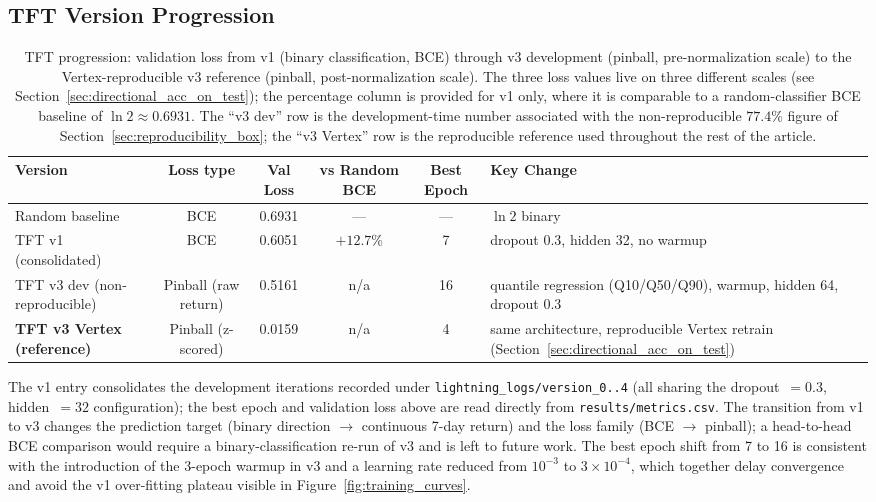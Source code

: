 \documentclass[conference]{IEEEtran}
\begin{document}
\subsection{TFT Version Progression}

\begin{table}[htbp]
\centering
\caption{TFT progression: validation loss from v1 (binary classification, BCE) through v3 development (pinball, pre-normalization scale) to the Vertex-reproducible v3 reference (pinball, post-normalization scale). The three loss values live on three different scales (see Section~\ref{sec:directional_acc_on_test}); the percentage column is provided for v1 only, where it is comparable to a random-classifier BCE baseline of $\ln 2 \approx 0.6931$. The ``v3 dev'' row is the development-time number associated with the non-reproducible $77.4\%$ figure of Section~\ref{sec:reproducibility_box}; the ``v3 Vertex'' row is the reproducible reference used throughout the rest of the article.}
\label{tab:tft_progression}
\small
\begin{tabular}{lccccl}
\toprule
\textbf{Version} & \textbf{Loss type} & \textbf{Val Loss} & \textbf{vs Random BCE} & \textbf{Best Epoch} & \textbf{Key Change} \\
\midrule
Random baseline   & BCE     & 0.6931 & ---     & --- & $\ln 2$ binary \\
TFT v1 (consolidated)  & BCE     & 0.6051 & $+12.7\%$ & 7   & dropout 0.3, hidden 32, no warmup \\
TFT v3 dev (non-reproducible) & Pinball (raw return) & 0.5161 & n/a & 16 & quantile regression (Q10/Q50/Q90), warmup, hidden 64, dropout 0.3 \\
\textbf{TFT v3 Vertex (reference)} & Pinball (z-scored) & 0.0159 & n/a & 4 & same architecture, reproducible Vertex retrain (Section~\ref{sec:directional_acc_on_test}) \\
\bottomrule
\end{tabular}
\normalsize
\end{table}

The v1 entry consolidates the development iterations recorded under \texttt{lightning\_logs/version\_0..4} (all sharing the dropout~$=0.3$, hidden~$=32$ configuration); the best epoch and validation loss above are read directly from \texttt{results/metrics.csv}. The transition from v1 to v3 changes the prediction target (binary direction $\rightarrow$ continuous 7-day return) and the loss family (BCE $\rightarrow$ pinball); a head-to-head BCE comparison would require a binary-classification re-run of v3 and is left to future work. The best epoch shift from 7 to 16 is consistent with the introduction of the 3-epoch warmup in v3 and a learning rate reduced from $10^{-3}$ to $3\times 10^{-4}$, which together delay convergence and avoid the v1 over-fitting plateau visible in Figure~\ref{fig:training_curves}.
\end{document}
